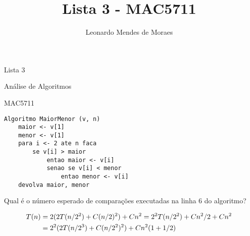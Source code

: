 \documentclass[12pt,a4paper]{article}
\author{Leonardo Mendes de Moraes }
\title{Lista 3 - MAC5711}
\date{}
\begin{document}
	\begin{center}
    {\huge Lista 3 \par} {\LARGE Análise de Algoritmos \par} {\Large MAC5711
    \par}
	\end{center}

\problem
    \begin{lstlisting}
Algoritmo MaiorMenor (v, n)
    maior <- v[1]
    menor <- v[1]
    para i <- 2 ate n faca
        se v[i] > maior
            entao maior <- v[i]
            senao se v[i] < menor
                entao menor <- v[i]
    devolva maior, menor
        \end{lstlisting}
    \subproblem{} Qual é o número esperado de comparações executadas na linha 6
    do algoritmo?

    \begin{equation} \label{eq1}
        \begin{split}
        T(n) & = 2(2T(n/2^2) + C(n/2)^2) + Cn^2 = 2^2T(n/2^2) + Cn^2/2 + Cn^2 \\
         & = 2^2(2T(n/2^3) + C(n/2^2)^2) + Cn^2(1 + 1/2)
        \end{split}
        \notag
        \end{equation}

\problem
\end{document}
